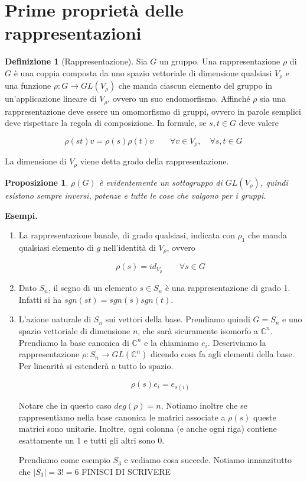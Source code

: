 \documentclass[11pt]{article}
\theoremstyle{plain}
\newtheorem{prop}[thm]{Proposizione}
\theoremstyle{definition}
\newtheorem{defn}{Definizione}[section]
\theoremstyle{remark}
\newcommand{\C}{\mathbb{C}}
\begin{document}
\newpage
\section{Prime proprietà delle rappresentazioni}

\begin{defn}[Rappresentazione] Sia $G$ un gruppo. Una rappresentazione $\rho$ di $G$ è una coppia composta da uno spazio vettoriale di dimensione qualsiasi $V_\rho$ e una funzione $\rho: G \to GL(V_\rho)$ che manda ciascun elemento del gruppo in un'applicazione lineare di $V_\rho$, ovvero un suo endomorfismo. Affinché $\rho$ sia una rappresentazione deve essere un omomorfismo di gruppi, ovvero in parole semplici deve rispettare la regola di composizione. In formule, se $s, t \in G$ deve valere

\[ \rho(st) v = \rho(s)\rho(t) v \qquad \forall v \in V_\rho, \quad \forall s,t \in G\]

La dimensione di $V_\rho$ viene detta grado della rappresentazione.

\end{defn}

\begin{prop} $\rho(G)$ è evidentemente un sottogruppo di $GL(V_\rho)$, quindi esistono sempre inversi, potenze e tutte le cose che valgono per i gruppi.

\end{prop}


\textbf{Esempi.}
\begin{enumerate}
	\item La rappresentazione banale, di grado qualsiasi, indicata con $\rho_1$ che manda qualsiasi elemento di $g$ nell'identità di $V_\rho$, ovvero
	
	\[ \rho(s ) = id_{V_\rho} \qquad \forall s \in G\]
	\item Dato $S_n$, il segno di un elemento $s\in S_n$ è una rappresentazione di grado 1. Infatti si ha $sgn(st) = sgn(s) sgn(t)$.
	\item L'azione naturale di $S_n$ sui vettori della base. Prendiamo quindi $G = S_n$ e uno spazio vettoriale di dimensione $n$, che sarà sicuramente isomorfo a $\C^n$. Prendiamo la base canonica di $\C^n$ e la chiamiamo $e_i$. Descriviamo la rappresentazione $\rho: S_n \to GL(\C^n)$ dicendo cosa fa agli elementi della base. Per linearità si estenderà a tutto lo spazio.
	
	\[ \rho(s) e_i = e_{s(i)}\]
	
	Notare che in questo caso $deg(\rho) = n$. Notiamo inoltre che se rappresentiamo nella base canonica le matrici associate a $\rho(s)$ queste matrici sono unitarie. Inoltre, ogni colonna (e anche ogni riga) contiene esattamente un 1 e tutti gli altri sono 0.
	
	Prendiamo come esempio $S_3$ e vediamo cosa succede. Notiamo innanzitutto che $ |S_3| = 3! = 6$
	FINISCI DI SCRIVERE
\end{enumerate}
\end{document}
